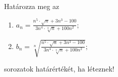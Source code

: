 \documentclass[11pt]{scrartcl}
\begin{document}
Határozza meg az
\begin{enumerate}
	\item \(\displaystyle
	      a_n = \frac{
		      n^5 \cdot \sqrt{n} + 3n^3 - 100
	      }{
		      3n^4 \cdot \sqrt[3]{n} + 100n^2
	      };
	      \)

	\item \(\displaystyle
	      b_n = \sqrt[n]{\frac{
				      n^5 \cdot \sqrt{n} + 3n^3 - 100
			      }{
				      3n^4 \cdot \sqrt[3]{n} + 100n^2
			      }};
	      \)
\end{enumerate}
sorozatok határértékét, ha léteznek!
\end{document}
